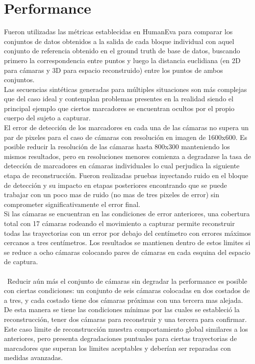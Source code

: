 \section{Performance}

Fueron utilizadas las métricas establecidas en HumanEva \cite{humaneva} para comparar los conjuntos de datos obtenidos a la salida de cada bloque individual con aquel conjunto de referencia obtenido en el ground truth de base de datos, buscando primero la correspondencia entre puntos y luego la distancia euclidiana (en 2D para cámaras y 3D para espacio reconstruido) entre los puntos de ambos conjuntos.
\\

Las secuencias sintéticas generadas para múltiples situaciones son más complejas que del caso ideal y contemplan problemas presentes en la realidad siendo el principal ejemplo que ciertos marcadores se encuentran ocultos por el propio cuerpo del sujeto a capturar. 
\\

El error de detección de los marcadores en cada una de las cámaras no supera un par de pixeles para el caso de cámaras con resolución en imagen de 1600x600. Es posible reducir la resolución de las cámaras hasta 800x300 manteniendo los mismos resultados, pero en resoluciones menores comienza a degradarse la tasa de detección de marcadores en cámaras individuales lo cual perjudica la siguiente etapa de reconstrucción. Fueron realizadas pruebas inyectando ruido en el bloque de detección y su impacto en etapas posteriores encontrando que se puede trabajar con un poco mas de ruido (no mas de tres pixeles de error) sin comprometer significativamente el error final.
\\

Si las cámaras se encuentran en las condiciones de error anteriores, una cobertura total con 17 cámaras rodeando el movimiento a capturar permite reconstruir todas las trayectorias con un error por debajo del centímetro con errores máximos cercanos a tres centímetros. Los resultados se mantienen dentro de estos limites si se reduce a ocho cámaras colocando pares de cámaras en cada esquina del espacio de captura. \\\\\
Reducir aún más el conjunto de cámaras sin degradar la performance es posible con ciertas condiciones: un conjunto de seis cámaras colocadas en dos costados de a tres, y cada costado tiene dos cámaras próximas con una tercera mas alejada. De esta manera se tiene las condiciones mínimas por las cuales se estableció la reconstrucción, tener dos cámaras para reconstruir y una tercera para confirmar.
\\

Este caso limite de reconstrucción muestra comportamiento global similares a los anteriores, pero presenta degradaciones puntuales para ciertas trayectorias de marcadores que superan los limites aceptables y deberían ser reparadas con medidas avanzadas.

